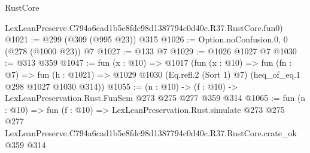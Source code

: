 \begin{lexlean}{RustCore}
\begin{coremodule}
    LexLeanPreserve.C794a6cad1b5e8fdc98d1387794c0d40c.R37.RustCore.fun0)
@1021 := @299 (@309 (@995 @23)) @315
@1026 := Option.noConfusion.{0, 0} (@278 (@1000 @23)) @7
@1027 := @133 @7
@1029 := @1026 @1027 @7
@1030 := @313 @359
@1047 := fun (x : @10) =>
  @1017
    (fun (x : @10) =>
    fun (fn : @7) =>
    fun (h : @1021) => @1029 @1030 (Eq.refl.{2} (Sort 1) @7) (heq_of_eq.{1} @298 @1027 @1030 @314))
@1055 := (n : @10) -> (f : @10) -> LexLeanPreservation.Rust.FunSem @273 @275 @277 @359 @314
@1065 := fun (n : @10) =>
  fun (f : @10) =>
  LexLeanPreservation.Rust.simulate
    @273
    @275
    @277
    LexLeanPreserve.C794a6cad1b5e8fdc98d1387794c0d40c.R37.RustCore.crate_ok
    @359
    @314
\end{coremodule}
\end{lexlean}
